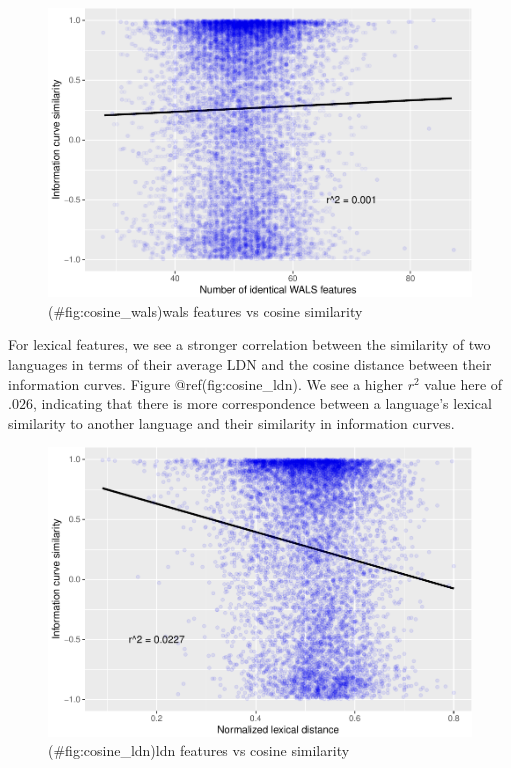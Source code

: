 \documentclass[11pt,]{article}
\begin{document}
\begin{figure}
\centering
\includegraphics{paper_files/figure-latex/cosine_wals-1.pdf}
\caption{(\#fig:cosine\_wals)wals features vs cosine similarity}
\end{figure}

For lexical features, we see a stronger correlation between the similarity of two languages in terms of their average LDN and the cosine distance between their information curves. Figure @ref(fig:cosine\_ldn). We see a higher \(r^2\) value here of \(.026\), indicating that there is more correspondence between a language's lexical similarity to another language and their similarity in information curves.

\begin{figure}
\centering
\includegraphics{paper_files/figure-latex/cosine_ldn-1.pdf}
\caption{(\#fig:cosine\_ldn)ldn features vs cosine similarity}
\end{figure}
\end{document}
